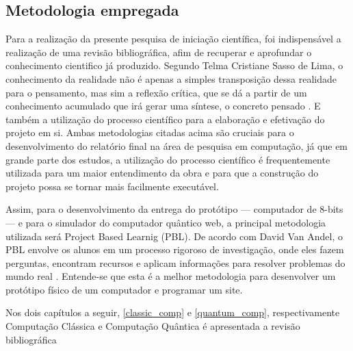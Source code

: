 \subsection{Metodologia empregada}
Para a realização da presente pesquisa de iniciação científica, foi indispensável a realização de uma revisão bibliográfica, afim de recuperar e aprofundar o conhecimento cientifico já produzido. Segundo Telma Cristiane Sasso de Lima, o conhecimento da realidade não é apenas a simples transposição dessa realidade para o pensamento, mas sim a reflexão crítica, que se dá a partir de um conhecimento acumulado que irá gerar uma síntese, o concreto pensado \cite{1}. E também a utilização do processo científico para a elaboração e efetivação do projeto em si. Ambas metodologias citadas acima são cruciais para o desenvolvimento do relatório final na área de pesquisa em computação, já que em grande parte dos estudos, a utilização do processo científico é frequentemente utilizada para um maior entendimento da obra e para que a construção do projeto possa se tornar mais facilmente executável.

Assim, para o desenvolvimento da entrega do protótipo — computador de 8-bits — e para o simulador do computador quântico web, a principal metodologia utilizada será Project Based Learnig (PBL). De acordo com David Van Andel, o PBL envolve os alunos em um processo rigoroso de investigação, onde eles fazem perguntas, encontram recursos e aplicam informações para resolver problemas do mundo real \cite{3}. Entende-se que esta é a melhor metodologia para desenvolver um protótipo físico de um computador e programar um site.

Nos dois capítulos a seguir, \ref{classic_comp} e \ref{quantum_comp}, respectivamente Computação Clássica e Computação Quântica é apresentada a revisão bibliográfica 


\newpage

